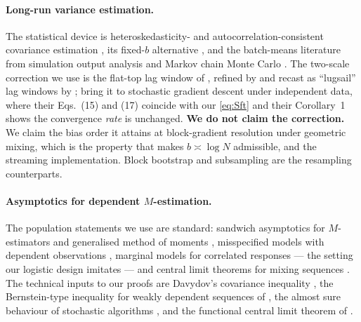 \paragraph{Long-run variance estimation.}
The statistical device is heteroskedasticity- and autocorrelation-consistent covariance
estimation \citep{newey1987simple,andrews1991heteroskedasticity,andrews1992improved,newey1994automatic,white1980hetero,white1984asymptotic},
its fixed-$b$ alternative \citep{kiefer2002heteroskedasticity,kiefer2005new,sun2008optimal},
and the batch-means literature from simulation output analysis and Markov chain Monte
Carlo \citep{glynn1991estimating,glynn1992asymptotic,damerdji1994strong,flegal2010batch,jones2006fixed,vats2019multivariate}.
The two-scale correction we use is the flat-top lag window of
\citet{politis1995bias}, refined by \citet{politis2011higher} and recast as ``lugsail''
lag windows by \citet{vats2022lugsail}; \citet{singh2025utility} bring it to stochastic
gradient descent under independent data, where their Eqs.~(15) and (17) coincide with our
\eqref{eq:Sft} and their Corollary~1 shows the convergence \emph{rate} is unchanged.
\textbf{We do not claim the correction.} We claim the bias order it attains at
block-gradient resolution under geometric mixing, which is the property that makes
$b\asymp\log N$ admissible, and the streaming implementation.
Block bootstrap and subsampling \citep{kunsch1989jackknife,politis1999subsampling,lahiri2003resampling}
are the resampling counterparts.

\paragraph{Asymptotics for dependent $M$-estimation.}
The population statements we use are standard: sandwich asymptotics for $M$-estimators and
generalised method of moments \citep{huber1967behavior,hansen1982gmm,white1982mle,vandervaart1998asymptotic},
misspecified models with dependent observations \citep{domowitz1982misspecified}, marginal
models for correlated responses \citep{liang1986longitudinal,zeger1986longitudinal} --- the
setting our logistic design imitates --- and central limit theorems for mixing sequences
\citep{rosenblatt1956central,ibragimov1962some,herrndorf1984functional,wooldridge1988invariance,doukhan1994mixing,bradley2005basic,merlevede2006recent,rio2017asymptotic,dedecker2007weak}.
The technical inputs to our proofs are Davydov's covariance inequality
\citep{davydov1968convergence,rio1993covariance}, the Bernstein-type inequality for weakly
dependent sequences of \citet{merlevede2011bernstein}, the almost sure behaviour of
stochastic algorithms \citep{pelletier1998almost,pelletier2000asymptotic,fabian1968asymptotic,mokkadem2011generalization,robbins1971convergence},
and the functional central limit theorem of \citet{herrndorf1984functional}.

